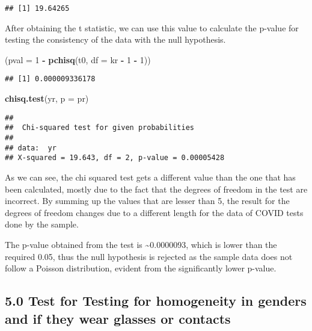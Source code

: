 \documentclass[
]{article}
\newenvironment{Shaded}{\begin{snugshade}}{\end{snugshade}}
\newcommand{\DataTypeTok}[1]{\textcolor[rgb]{0.13,0.29,0.53}{#1}}
\newcommand{\DecValTok}[1]{\textcolor[rgb]{0.00,0.00,0.81}{#1}}
\newcommand{\KeywordTok}[1]{\textcolor[rgb]{0.13,0.29,0.53}{\textbf{#1}}}
\newcommand{\NormalTok}[1]{#1}
\newcommand{\OperatorTok}[1]{\textcolor[rgb]{0.81,0.36,0.00}{\textbf{#1}}}
\newcommand{\StringTok}[1]{\textcolor[rgb]{0.31,0.60,0.02}{#1}}
\begin{document}
\begin{verbatim}
## [1] 19.64265
\end{verbatim}

After obtaining the t statistic, we can use this value to calculate the
p-value for testing the consistency of the data with the null
hypothesis.

\begin{Shaded}
\begin{Highlighting}[]
\NormalTok{(}\DataTypeTok{pval =} \DecValTok{1} \OperatorTok{-}\StringTok{ }\KeywordTok{pchisq}\NormalTok{(t0, }\DataTypeTok{df =}\NormalTok{ kr }\OperatorTok{-}\StringTok{ }\DecValTok{1} \OperatorTok{-}\StringTok{ }\DecValTok{1}\NormalTok{))}
\end{Highlighting}
\end{Shaded}

\begin{verbatim}
## [1] 0.000009336178
\end{verbatim}

\begin{Shaded}
\begin{Highlighting}[]
\KeywordTok{chisq.test}\NormalTok{(yr, }\DataTypeTok{p =}\NormalTok{ pr)}
\end{Highlighting}
\end{Shaded}

\begin{verbatim}
## 
##  Chi-squared test for given probabilities
## 
## data:  yr
## X-squared = 19.643, df = 2, p-value = 0.00005428
\end{verbatim}

As we can see, the chi squared test gets a different value than the one
that has been calculated, mostly due to the fact that the degrees of
freedom in the test are incorrect. By summing up the values that are
lesser than 5, the result for the degrees of freedom changes due to a
different length for the data of COVID tests done by the sample.

The p-value obtained from the test is \textasciitilde0.0000093, which is
lower than the required 0.05, thus the null hypothesis is rejected as
the sample data does not follow a Poisson distribution, evident from the
significantly lower p-value.

\hypertarget{test-for-testing-for-homogeneity-in-genders-and-if-they-wear-glasses-or-contacts}{%
\subsection{5.0 Test for Testing for homogeneity in genders and if they
wear glasses or
contacts}\label{test-for-testing-for-homogeneity-in-genders-and-if-they-wear-glasses-or-contacts}}
\end{document}
